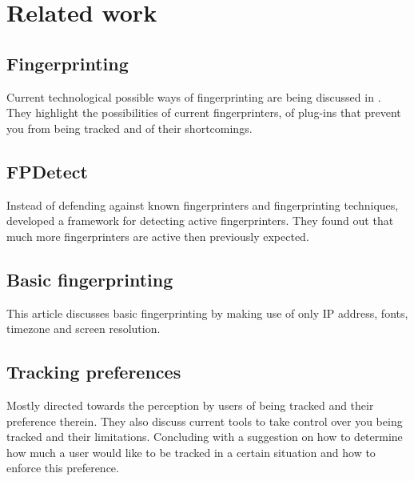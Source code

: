 \section{Related work}

\subsection{Fingerprinting}

Current technological possible ways of fingerprinting
are being discussed in \cite{nikiforakis2014workings}.
They highlight the possibilities of current fingerprinters,
of plug-ins that prevent you from being tracked
and of their shortcomings.

\subsection{FPDetect}

Instead of defending against known fingerprinters
and fingerprinting techniques,
\cite{acar2013fpdetective} developed a framework
for detecting active fingerprinters.
They found out
that much more fingerprinters are active then previously expected.

\subsection{Basic fingerprinting}

This article discusses basic fingerprinting
by making use of only IP address, fonts, timezone and screen resolution.
\cite{boda2011user}

\subsection{Tracking preferences}

Mostly directed towards the perception by users of being tracked
and their preference therein.
\cite{melicher2015not}
They also discuss current tools to take control over you being tracked
and their limitations.
Concluding with a suggestion on how to determine
how much a user would like to be tracked in a certain situation
and how to enforce this preference.

